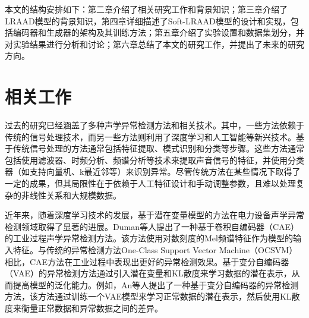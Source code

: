 \documentclass{article}
\begin{document}
本文的结构安排如下：第二章介绍了相关研究工作和背景知识；第三章介绍了LRAAD模型的背景知识，第四章详细描述了Soft-LRAAD模型的设计和实现，包括编码器和生成器的架构及其训练方法；第五章介绍了实验设置和数据集划分，并对实验结果进行分析和讨论；第六章总结了本文的研究工作，并提出了未来的研究方向。

\section{相关工作}

过去的研究已经涵盖了多种声学异常检测方法和相关技术。其中，一些方法依赖于传统的信号处理技术，而另一些方法则利用了深度学习和人工智能等新兴技术\cite{mnasri2022anomalous, jombo2023acoustic}。基于传统信号处理的方法通常包括特征提取、模式识别和分类等步骤。这些方法通常包括使用滤波器、时频分析、频谱分析等技术来提取声音信号的特征，并使用分类器（如支持向量机、k最近邻等）来识别异常。尽管传统方法在某些情况下取得了一定的成果，但其局限性在于依赖于人工特征设计和手动调整参数，且难以处理复杂的非线性关系和大规模数据\cite{pang2021deep, chalapathy2019deep, shi2021equipment}。

近年来，随着深度学习技术的发展，基于潜在变量模型的方法在电力设备声学异常检测领域取得了显著的进展\cite{AE-AD,AE-AD-2,CAE-AD,VAE-AD,VAE-AD-2,SAE-AD}。Duman等人\cite{CAE-AD}提出了一种基于卷积自编码器（CAE）的工业过程声学异常检测方法。该方法使用对数刻度的Mel频谱特征作为模型的输入特征。与传统的异常检测方法One-Class Support Vector Machine（OCSVM）\cite{ocsvm}相比，CAE方法在工业过程中表现出更好的异常检测效果。基于变分自编码器（VAE）的异常检测方法\cite{VAE-AD,VAE-AD-2}通过引入潜在变量和KL散度来学习数据的潜在表示，从而提高模型的泛化能力。例如，An等人\cite{VAE-AD}提出了一种基于变分自编码器的异常检测方法，该方法通过训练一个VAE模型来学习正常数据的潜在表示，然后使用KL散度来衡量正常数据和异常数据之间的差异。
\end{document}
